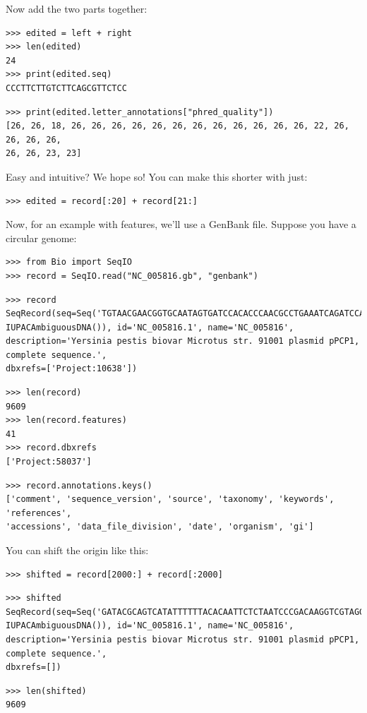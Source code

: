 \documentclass{report}
\begin{document}
\noindent Now add the two parts together:

\begin{verbatim}
>>> edited = left + right
>>> len(edited)
24
>>> print(edited.seq)
CCCTTCTTGTCTTCAGCGTTCTCC
\end{verbatim}
\begin{verbatim}
>>> print(edited.letter_annotations["phred_quality"])
[26, 26, 18, 26, 26, 26, 26, 26, 26, 26, 26, 26, 26, 26, 26, 22, 26, 26, 26, 26,
26, 26, 23, 23]
\end{verbatim}

\noindent Easy and intuitive? We hope so! You can make this shorter with just:

\begin{verbatim}
>>> edited = record[:20] + record[21:]
\end{verbatim}

Now, for an example with features, we'll use a GenBank file.
Suppose you have a circular genome:

\begin{verbatim}
>>> from Bio import SeqIO
>>> record = SeqIO.read("NC_005816.gb", "genbank")
\end{verbatim}
\begin{verbatim}
>>> record
SeqRecord(seq=Seq('TGTAACGAACGGTGCAATAGTGATCCACACCCAACGCCTGAAATCAGATCCAGG...CTG',
IUPACAmbiguousDNA()), id='NC_005816.1', name='NC_005816',
description='Yersinia pestis biovar Microtus str. 91001 plasmid pPCP1, complete sequence.',
dbxrefs=['Project:10638'])
\end{verbatim}
\begin{verbatim}
>>> len(record)
9609
>>> len(record.features)
41
>>> record.dbxrefs
['Project:58037']
\end{verbatim}
\begin{verbatim}
>>> record.annotations.keys()
['comment', 'sequence_version', 'source', 'taxonomy', 'keywords', 'references',
'accessions', 'data_file_division', 'date', 'organism', 'gi']
\end{verbatim}

You can shift the origin like this:

\begin{verbatim}
>>> shifted = record[2000:] + record[:2000]
\end{verbatim}
\begin{verbatim}
>>> shifted
SeqRecord(seq=Seq('GATACGCAGTCATATTTTTTACACAATTCTCTAATCCCGACAAGGTCGTAGGTC...GGA',
IUPACAmbiguousDNA()), id='NC_005816.1', name='NC_005816',
description='Yersinia pestis biovar Microtus str. 91001 plasmid pPCP1, complete sequence.',
dbxrefs=[])
\end{verbatim}
\begin{verbatim}
>>> len(shifted)
9609
\end{verbatim}
\end{document}
